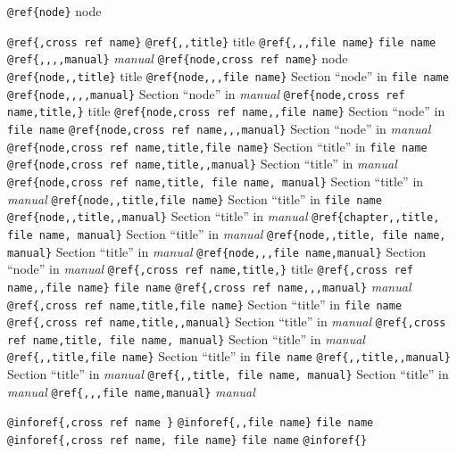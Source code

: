 \documentclass{book}
\makeatletter
\renewcommand\mainmatter{\clearpage\@mainmattertrue\pagenumbering{arabic}}
\newcommand\GNUTexinfomainmatter{\mainmatter}
\newcommand{\GNUTexinfosetsingleheader}{\pagestyle{single}}
\makeatother
\begin{document}
\begin{titlepage}
%

\texttt{@ref\{node\}} node

\texttt{@ref\{,cross ref name\}} 
\texttt{@ref\{,,title\}} title
\texttt{@ref\{,,,file name\}} \texttt{file name}
\texttt{@ref\{,,,,manual\}} \textit{manual}
\texttt{@ref\{node,cross ref name\}} node
\texttt{@ref\{node,,title\}} title
\texttt{@ref\{node,,,file name\}} Section ``node'' in \texttt{file name}
\texttt{@ref\{node,,,,manual\}} Section ``node'' in \textit{manual}
\texttt{@ref\{node,cross ref name,title,\}} title
\texttt{@ref\{node,cross ref name,,file name\}} Section ``node'' in \texttt{file name}
\texttt{@ref\{node,cross ref name,,,manual\}} Section ``node'' in \textit{manual}
\texttt{@ref\{node,cross ref name,title,file name\}} Section ``title'' in \texttt{file name}
\texttt{@ref\{node,cross ref name,title,,manual\}} Section ``title'' in \textit{manual}
\texttt{@ref\{node,cross ref name,title, file name, manual\}} Section ``title'' in \textit{manual}
\texttt{@ref\{node,,title,file name\}} Section ``title'' in \texttt{file name}
\texttt{@ref\{node,,title,,manual\}} Section ``title'' in \textit{manual}
\texttt{@ref\{chapter,,title, file name, manual\}} Section ``title'' in \textit{manual}
\texttt{@ref\{node,,title, file name, manual\}} Section ``title'' in \textit{manual}
\texttt{@ref\{node,,,file name,manual\}} Section ``node'' in \textit{manual}
\texttt{@ref\{,cross ref name,title,\}} title
\texttt{@ref\{,cross ref name,,file name\}} \texttt{file name}
\texttt{@ref\{,cross ref name,,,manual\}} \textit{manual}
\texttt{@ref\{,cross ref name,title,file name\}} Section ``title'' in \texttt{file name}
\texttt{@ref\{,cross ref name,title,,manual\}} Section ``title'' in \textit{manual}
\texttt{@ref\{,cross ref name,title, file name, manual\}} Section ``title'' in \textit{manual}
\texttt{@ref\{,,title,file name\}} Section ``title'' in \texttt{file name}
\texttt{@ref\{,,title,,manual\}} Section ``title'' in \textit{manual}
\texttt{@ref\{,,title, file name, manual\}} Section ``title'' in \textit{manual}
\texttt{@ref\{,,,file name,manual\}} \textit{manual}

\texttt{@inforef\{,cross ref name \}} 
\texttt{@inforef\{,,file name\}} \texttt{file name}
\texttt{@inforef\{,cross ref name, file name\}} \texttt{file name}
\texttt{@inforef\{\}} 


\end{titlepage}
\GNUTexinfosetsingleheader{}%
\GNUTexinfomainmatter
\tableofcontents\newpage
\end{document}
